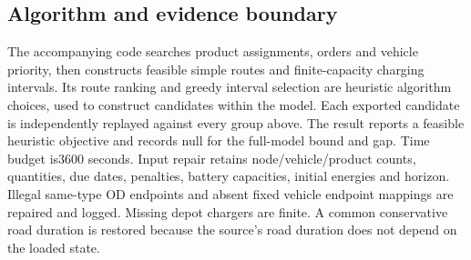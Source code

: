 \documentclass{article}
\begin{document}
\subsection*{Algorithm and evidence boundary}
The accompanying code searches product assignments, orders and vehicle priority,
then constructs feasible simple routes and finite-capacity charging intervals.
Its route ranking and greedy interval selection are heuristic algorithm choices,
used to construct candidates within the model. Each exported candidate is independently
replayed against every group above. The result reports a feasible heuristic objective and records null for the full-model bound and gap. Time budget is3600 seconds.
Input repair retains node/vehicle/product counts, quantities, due dates, penalties,
battery capacities, initial energies and horizon. Illegal same-type OD endpoints
and absent fixed vehicle endpoint mappings are repaired and logged. Missing depot
chargers are finite. A common conservative road duration is restored because the
source's road duration does not depend on the loaded state.
\end{document}
